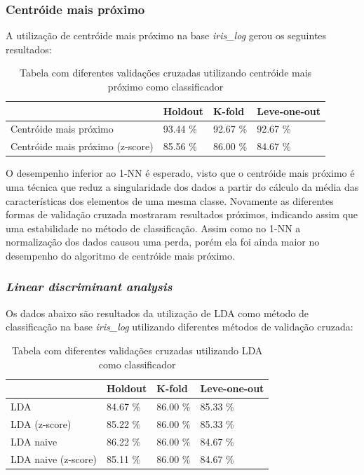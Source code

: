 \documentclass[paper=a4, fontsize=11pt]{scrartcl}
\numberwithin{equation}{section}		%
\numberwithin{figure}{section}			%
\numberwithin{table}{section}				%
\begin{document}
\subsubsection{Centróide mais próximo}
A utilização de centróide mais próximo na base \textit{iris\_log} gerou os seguintes resultados:

\begin{table}[h!]
\begin{tabular}{l|l|l|l|}
\cline{2-4}
                                                       & Holdout  & K-fold   & Leve-one-out \\ \hline
\multicolumn{1}{|l|}{Centróide mais próximo}           & 93.44 \% & 92.67 \% & 92.67 \%     \\ \hline
\multicolumn{1}{|l|}{Centróide mais próximo (z-score)} & 85.56 \% & 86.00 \% & 84.67 \%     \\ \hline
\end{tabular}
\caption{Tabela com diferentes validações cruzadas utilizando centróide mais próximo como classificador}
\end{table}

O desempenho inferior ao 1-NN é esperado, visto que o centróide mais próximo é uma técnica que reduz a singularidade dos dados a partir do cálculo da média das características dos elementos de uma mesma classe. Novamente as diferentes formas de validação cruzada mostraram resultados próximos, indicando assim que uma estabilidade no método de classificação.
Assim como no 1-NN a normalização dos dados causou uma perda, porém ela foi ainda maior no desempenho do algoritmo de centróide mais próximo.

\subsubsection{ \textit{Linear discriminant analysis} }

Os dados abaixo são resultados da utilização de LDA como método de classificação na base \textit{iris\_log} utilizando diferentes métodos de validação cruzada: 

\begin{table}[h!]
\begin{tabular}{l|l|l|l|}
\cline{2-4}
                                                       & Holdout  & K-fold   & Leve-one-out \\ \hline
\multicolumn{1}{|l|}{LDA}                              & 84.67 \% & 86.00 \% & 85.33 \%     \\ \hline
\multicolumn{1}{|l|}{LDA (z-score)}                    & 85.22 \% & 86.00 \% & 85.33 \%     \\ \hline
\multicolumn{1}{|l|}{LDA naive}                        & 86.22 \% & 86.00 \% & 84.67 \%     \\ \hline
\multicolumn{1}{|l|}{LDA naive (z-score)}              & 85.11 \% & 86.00 \% & 84.67 \%     \\ \hline
\end{tabular}
\caption{Tabela com diferentes validações cruzadas utilizando LDA como classificador}
\end{table}
\end{document}
